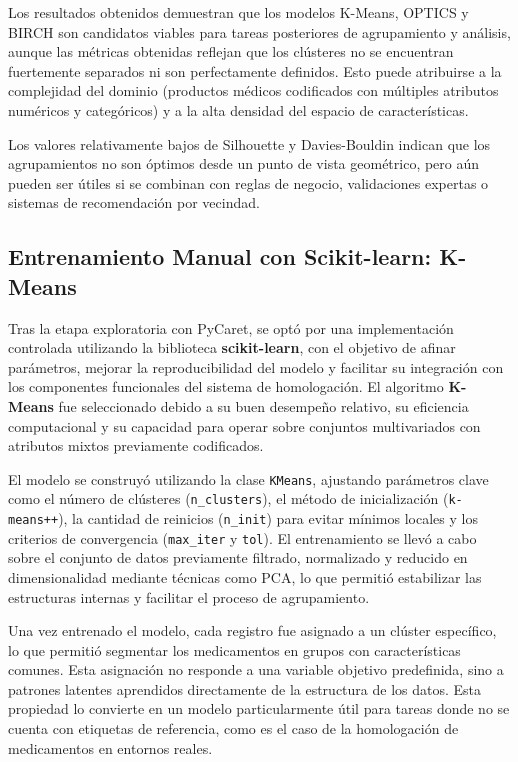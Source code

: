 \documentclass[conference]{IEEEtran}
\begin{document}
Los resultados obtenidos demuestran que los modelos K-Means, OPTICS y BIRCH son candidatos viables para tareas posteriores de agrupamiento y análisis, aunque las métricas obtenidas reflejan que los clústeres no se encuentran fuertemente separados ni son perfectamente definidos. Esto puede atribuirse a la complejidad del dominio (productos médicos codificados con múltiples atributos numéricos y categóricos) y a la alta densidad del espacio de características.

Los valores relativamente bajos de Silhouette y Davies-Bouldin indican que los agrupamientos no son óptimos desde un punto de vista geométrico, pero aún pueden ser útiles si se combinan con reglas de negocio, validaciones expertas o sistemas de recomendación por vecindad.

\subsection{Entrenamiento Manual con Scikit-learn: K-Means}

Tras la etapa exploratoria con PyCaret, se optó por una implementación controlada utilizando la biblioteca \textbf{scikit-learn}, con el objetivo de afinar parámetros, mejorar la reproducibilidad del modelo y facilitar su integración con los componentes funcionales del sistema de homologación. El algoritmo \textbf{K-Means} fue seleccionado debido a su buen desempeño relativo, su eficiencia computacional y su capacidad para operar sobre conjuntos multivariados con atributos mixtos previamente codificados.

El modelo se construyó utilizando la clase \texttt{KMeans}, ajustando parámetros clave como el número de clústeres (\texttt{n\_clusters}), el método de inicialización (\texttt{k-means++}), la cantidad de reinicios (\texttt{n\_init}) para evitar mínimos locales y los criterios de convergencia (\texttt{max\_iter} y \texttt{tol}). El entrenamiento se llevó a cabo sobre el conjunto de datos previamente filtrado, normalizado y reducido en dimensionalidad mediante técnicas como PCA, lo que permitió estabilizar las estructuras internas y facilitar el proceso de agrupamiento.

Una vez entrenado el modelo, cada registro fue asignado a un clúster específico, lo que permitió segmentar los medicamentos en grupos con características comunes. Esta asignación no responde a una variable objetivo predefinida, sino a patrones latentes aprendidos directamente de la estructura de los datos. Esta propiedad lo convierte en un modelo particularmente útil para tareas donde no se cuenta con etiquetas de referencia, como es el caso de la homologación de medicamentos en entornos reales.
\end{document}
